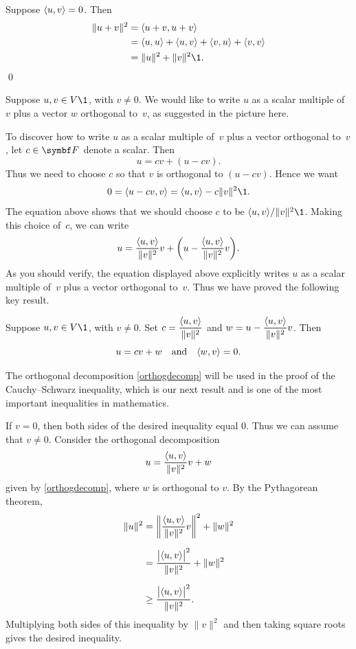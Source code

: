 
\proof
Suppose $\langle u, v\rangle = 0$. Then
\begin{align*}
\|u + v\|^2 &= \ip{u+ v, u + v} \\
&= \ip{u, u} + \ip{u, v} + \ip{v, u} + \ip{v, v} \\
&= \|u\|^2 + \|v\|^2\1. 
\end{align*}
\qed


Suppose $u, v \in V\1$, with $v \ne 0$.  We would like to write $u$ as a scalar multiple of~$v$ plus a
vector $w$ orthogonal to~$v$, as suggested in the picture here.


To discover how to write $u$ as a scalar multiple of~$v$ plus a vector orthogonal
to~$v$, let $c \in \F{}$ denote a scalar.  Then
\[
u = c v + (u - c v).
\]
Thus we need to choose $c$ so that $v$ is orthogonal to $(u - c v)$. Hence we want
\[
0 = \ip{u - c v, v} = \ip{u,v} - c \|v\|^2\1.
\]
The equation above shows that we should choose $c$ to be $\ip{u,v}/\|v\|^2\1$.  Making this choice of~$c$, we
can write
\[
u = \frac{\ip{u,v}}{\|v\|^2} v + \paren[\bigg]{ u - \frac{\ip{u,v}}{\|v\|^2} v }.
\]
As you should verify, the equation displayed above explicitly writes $u$ as a scalar
multiple of~$v$ plus a vector orthogonal to~$v$. Thus we have proved the following key result.

{Suppose $u, v \in V\1$, with $v \ne 0$. Set $c =  \dfrac{\ip{u,v}}{\|v\|^2}$ and $w = u - \dfrac{\ip{u,v}}{\|v\|^2} v$. Then
\[
u = c v + w \quad \text{and} \quad \langle w, v\rangle = 0.
\]}

The orthogonal decomposition \ref{orthogdecomp} will be used in the proof of the Cauchy--Schwarz inequality, which is our next result and is one of the most important inequalities in mathematics.


\proof
If $v = 0$, then both sides of the desired inequality equal $0$.  Thus we can
assume that $v \ne 0$.  Consider the orthogonal decomposition
\[
u = \frac{\ip{u,v}}{\|v\|^2} v + w
\]
given by \ref{orthogdecomp}, where $w$ is orthogonal to $v$.  By the Pythagorean theorem,
\begin{align}
\|u\|^2 &= \norm[\bigg]{ \frac{\ip{u,v}}{\|v\|^2} v }^2 + \norm{w}^2 \notag \\[6bp]
&= \frac{\abs[\big]{\ip{u,v}}^2}{\|v\|^2}  + \|w\|^2 \notag \\[6bp]
&\ge \frac{\abs[\big]{\ip{u,v}}^2}{\|v\|^2}. \label{336}
\end{align}
Multiplying both sides of this inequality by $\|v\|^2$ and  then taking square roots gives the desired inequality.

